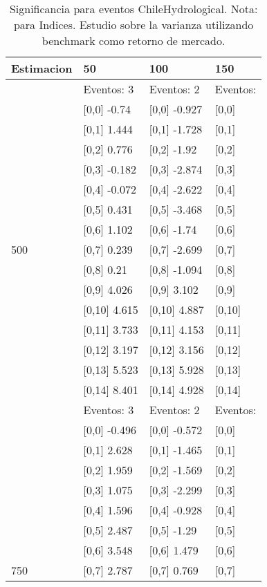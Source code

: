 \begin{table}

\caption{Significancia para eventos ChileHydrological. Nota: para Indices. Estudio sobre la varianza utilizando benchmark como retorno de mercado.}
\centering
\begin{tabular}[t]{llll}
\toprule
Estimacion & 50 & 100 & 150\\
\midrule
 & Eventos:  3 & Eventos:  2 & Eventos:\\
 & {}[0,0] -0.74 & {}[0,0] -0.927 & {}[0,0]\\
 & {}[0,1] 1.444 & {}[0,1] -1.728 & {}[0,1]\\
 & {}[0,2] 0.776 & {}[0,2] -1.92 & {}[0,2]\\
 & {}[0,3] -0.182 & {}[0,3] -2.874 & {}[0,3]\\
\addlinespace
 & {}[0,4] -0.072 & {}[0,4] -2.622 & {}[0,4]\\
 & {}[0,5] 0.431 & {}[0,5] -3.468 & {}[0,5]\\
 & {}[0,6] 1.102 & {}[0,6] -1.74 & {}[0,6]\\
500 & {}[0,7] 0.239 & {}[0,7] -2.699 & {}[0,7]\\
 & {}[0,8] 0.21 & {}[0,8] -1.094 & {}[0,8]\\
\addlinespace
 & {}[0,9] 4.026 & {}[0,9] 3.102 & {}[0,9]\\
 & {}[0,10] 4.615 & {}[0,10] 4.887 & {}[0,10]\\
 & {}[0,11] 3.733 & {}[0,11] 4.153 & {}[0,11]\\
 & {}[0,12] 3.197 & {}[0,12] 3.156 & {}[0,12]\\
 & {}[0,13] 5.523 & {}[0,13] 5.928 & {}[0,13]\\
\addlinespace
 & {}[0,14] 8.401 & {}[0,14] 4.928 & {}[0,14]\\
 & Eventos:  3 & Eventos:  2 & Eventos:\\
 & {}[0,0] -0.496 & {}[0,0] -0.572 & {}[0,0]\\
 & {}[0,1] 2.628 & {}[0,1] -1.465 & {}[0,1]\\
 & {}[0,2] 1.959 & {}[0,2] -1.569 & {}[0,2]\\
\addlinespace
 & {}[0,3] 1.075 & {}[0,3] -2.299 & {}[0,3]\\
 & {}[0,4] 1.596 & {}[0,4] -0.928 & {}[0,4]\\
 & {}[0,5] 2.487 & {}[0,5] -1.29 & {}[0,5]\\
 & {}[0,6] 3.548 & {}[0,6] 1.479 & {}[0,6]\\
750 & {}[0,7] 2.787 & {}[0,7] 0.769 & {}[0,7]\\

\end{tabular}
\end{table}
